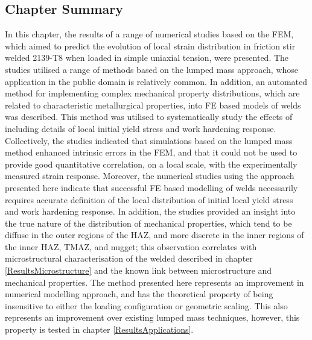 \subsection{Chapter Summary}
\label{SMDSummary}
In this chapter, the results of a range of numerical studies based on the FEM, which aimed to predict the evolution of local strain distribution in friction stir welded 2139-T8 when loaded in simple uniaxial tension, were presented. The studies utilised a range of methods based on the lumped mass approach, whose application in the public domain is relatively common. In addition, an automated method for implementing complex mechanical property distributions, which are related to characteristic metallurgical properties, into FE based models of welds was described. This method was utilised to systematically study the effects of including details of local initial yield stress and work hardening response. Collectively, the studies indicated that simulations based on the lumped mass method enhanced intrinsic errors in the FEM, and that it could not be used to provide good quantitative correlation, on a local scale, with the experimentally measured strain response. Moreover, the numerical studies using the approach presented here indicate that successful FE based modelling of welds necessarily requires accurate definition of the local distribution of initial local yield stress and work hardening response. In addition, the studies provided an insight into the true nature of the distribution of mechanical properties, which tend to be diffuse in the outer regions of the HAZ, and more discrete in the inner regions of the inner HAZ, TMAZ, and nugget; this observation correlates with microstructural characterisation of the welded described in chapter \ref{ResultsMicrostructure} and the known link between microstructure and mechanical properties. The method presented here represents an improvement in numerical modelling approach, and has the theoretical property of being insensitive to either the loading configuration or geometric scaling. This also represents an improvement over existing lumped mass techniques, however, this property is tested in chapter \ref{ResultsApplications}.
